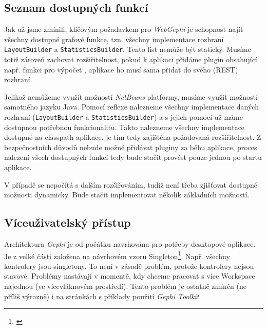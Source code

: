 \documentclass[thesis=M,czech]{FITthesis}[2014/05/6]
\begin{document}


\subsection{Seznam dostupných funkcí}
Jak už jsme zmínili, klíčovým požadavkem pro \textit{WebGephi} je schopnost najít všechny dostupné grafové funkce, tzn. všechny implementace
rozhraní \texttt{LayoutBuilder} a \texttt{StatisticsBuilder}. Tento list nemůže být statický. Musíme totiž zároveň zachovat rozšiřitelnost, 
pokud k aplikaci přidáme plugin obsahující např. funkci pro výpočet , aplikace ho musí sama přidat do svého (REST) rozhraní.

Jelikož nemůžeme využít možností \textit{NetBeans} platformy, musíme využít možností samotného jazyku Java. Pomocí reflexe nalezneme všechny
implementace daných rozhraní (\texttt{LayoutBuilder} a \texttt{StatisticsBuilder}) a s jejich pomocí už máme dostupnou potřebnou funkcionalitu.
Takto nalezneme všechny implementace dostupné na classpath aplikace, je tím tedy zajištěna požadovaná rozšiřitelnost. Z bezpečnostních důvodů
nebude možné přidávat pluginy za běhu aplikace, proces nalezení všech dostupných funkcí tedy bude stačit provést pouze jednou po startu aplikace.

V případě  se nepočítá s dalším rozšiřováním, tudíž není třeba zjišťovat dostupné možnosti dynamicky. Bude stačit implementovat několik základních možností.
 
\subsection{Víceuživatelský přístup}
Architektura \textit{Gephi} je od počátku navrhována pro potřeby desktopové aplikace. Je z velké části založena na návrhovém vzoru Singleton\footnote{\textit{}\cite{wiki:singleton}}. 
 Např. všechny kontrolery jsou singletony. To není v zásadě problém, protože kontrolery nejsou stavové. Problémy nastávají v momentě, kdy chceme pracovat s více Workspace 
 najednou (ve vícevláknovém prostředí). Tento problém je ostatně zmíněn (ne příliš výrazně) i na stránkách s příklady použití \textit{Gephi Toolkit}.
 
\end{document}
